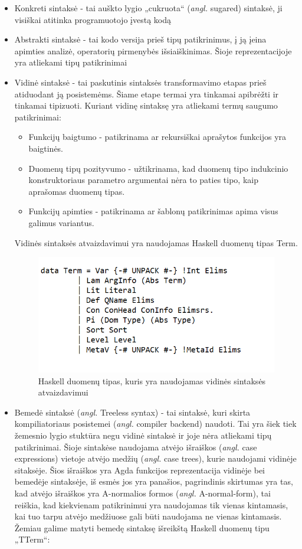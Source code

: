 \documentclass{VUMIFPSkursinis}
\begin{document}
\begin{itemize}
	\item Konkreti sintaksė - tai auškto lygio „cukruota“ (\textit{angl.} sugared) sintaksė, ji visiškai atitinka programuotojo įvestą kodą
	\item Abstrakti sintaksė - tai kodo versija prieš tipų patikrinimus, į ją įeina apimties analizė, operatorių pirmenybės išsiaiškinimas. Šioje reprezentacijoje yra atliekami tipų patikrinimai
	\item Vidinė sintaksė - tai paskutinis sintaksės transformavimo etapas prieš atiduodant ją posistemėms. Šiame etape termai yra tinkamai apibrėžti ir tinkamai tipizuoti. Kuriant vidinę sintaksę yra atliekami termų saugumo patikrinimai:
	\begin{itemize}
		\item Funkcijų baigtumo - patikrinama ar rekursiškai aprašytos funkcijos yra baigtinės.
		\item Duomenų tipų pozityvumo - užtikrinama, kad duomenų tipo indukcinio konstruktoriaus parametro argumentai nėra to paties tipo, kaip aprašomas duomenų tipas.
		\item Funkcijų apimties - patikrinama ar šablonų patikrinimas apima visus galimus variantus.
	\end{itemize}
	Vidinės sintaksės atvaizdavimui yra naudojamas Haskell duomenų tipas Term.
	\begin{figure}[H]
		\centering
		\includegraphics{HaskellTerm.png}
		\caption{Haskell duomenų tipas, kuris yra naudojamas vidinės sintaksės atvaizdavimui}
		\centering
		\end{figure}
		\item Bemedė sintaksė (\textit{angl.} Treeless syntax) - tai sintaksė, kuri skirta kompiliatoriaus posistemei (\textit{angl.} compiler backend) naudoti. Tai yra šiek tiek žemesnio lygio stuktūra negu vidinė sintaksė ir joje nėra atliekami tipų patikrinimai. Šioje sintakėse naudojama atvėjo išraiškos (\textit{angl.} case expressions) vietoje atvėjo medžių (\textit{angl.} case trees), kurie naudojami vidinėje sitaksėje. Šios išraiškos yra Agda funkcijos reprezentacija vidinėje bei bemedėje sintaksėje, iš esmės jos yra panašios, pagrindinis skirtumas yra tas, kad atvėjo išraiškos yra A-normalios formos (\textit{angl.} A-normal-form), tai reiškia, kad kiekvienam patikrinimui yra naudojamas tik vienas kintamasis, kai tuo tarpu atvėjo medžiuose gali būti naudojama ne vienas kintamasis. Žemiau galime matyti bemedę sintaksę išreikštą Haskell duomenų tipu „TTerm“:

\end{itemize}
\end{document}
